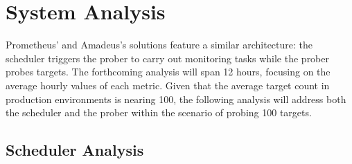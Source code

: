 \section{System Analysis}

Prometheus' and Amadeus's solutions feature a similar architecture: the scheduler triggers the prober to carry out monitoring tasks while the prober probes targets. The forthcoming analysis will span 12 hours, focusing on the average hourly values of each metric. Given that the average target count in production environments is nearing 100, the following analysis will address both the scheduler and the prober within the scenario of probing 100 targets. 

\subsection{Scheduler Analysis}

